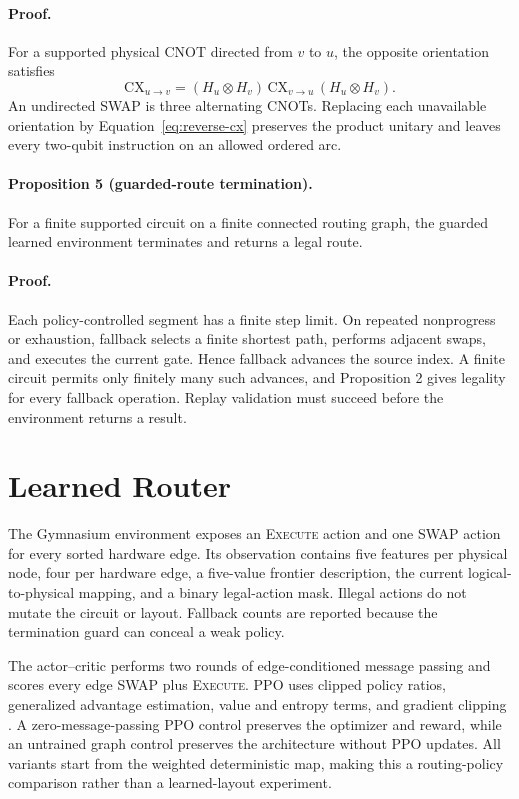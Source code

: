 \documentclass[a4paper,11pt,twocolumn]{article}
\begin{document}
\paragraph{Proof.}
For a supported physical CNOT directed from $v$ to $u$, the opposite
orientation satisfies
\begin{equation}
 \mathrm{CX}_{u\rightarrow v}
 =(H_u\otimes H_v)\,
 \mathrm{CX}_{v\rightarrow u}\,
 (H_u\otimes H_v).
 \label{eq:reverse-cx}
\end{equation}
An undirected SWAP is three alternating CNOTs. Replacing each unavailable
orientation by Equation~\eqref{eq:reverse-cx} preserves the product unitary
and leaves every two-qubit instruction on an allowed ordered arc.

\paragraph{Proposition 5 (guarded-route termination).}
For a finite supported circuit on a finite connected routing graph, the
guarded learned environment terminates and returns a legal route.

\paragraph{Proof.}
Each policy-controlled segment has a finite step limit. On repeated
nonprogress or exhaustion, fallback selects a finite shortest path, performs
adjacent swaps, and executes the current gate. Hence fallback advances the
source index. A finite circuit permits only finitely many such advances, and
Proposition 2 gives legality for every fallback operation. Replay validation
must succeed before the environment returns a result.

\section{Learned Router}
The Gymnasium environment exposes an \textsc{Execute} action and one SWAP
action for every sorted hardware edge. Its observation contains five features
per physical node, four per hardware edge, a five-value frontier description,
the current logical-to-physical mapping, and a binary legal-action mask.
Illegal actions do not mutate the circuit or layout. Fallback counts are
reported because the termination guard can conceal a weak policy.

The actor--critic performs two rounds of edge-conditioned message passing and
scores every edge SWAP plus \textsc{Execute}. PPO uses clipped policy ratios,
generalized advantage estimation, value and entropy terms, and gradient
clipping \citep{schulman2017ppo,schulman2015gae}. A zero-message-passing PPO
control preserves the optimizer and reward, while an untrained graph control
preserves the architecture without PPO updates. All variants start from the
weighted deterministic map, making this a routing-policy comparison rather
than a learned-layout experiment.
\end{document}
